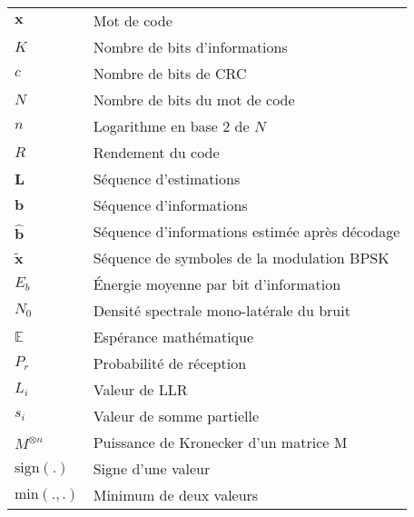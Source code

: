 {
\begin{center}

\begin{longtable}{ p{}  p{} } 

$\mathbold{x}$          & Mot de code                                             \\
$K$                     & Nombre de bits d'informations                           \\
$c$                     & Nombre de bits de CRC                                   \\
$N$                     & Nombre de bits du mot de code                           \\
$n$                     & Logarithme en base 2 de $N$                             \\
$R$                     & Rendement du code                                       \\
$\mathbold{L}$          & Séquence d'estimations                                  \\
$\mathbold{b}$          & Séquence d'informations                                 \\
$\mathbold{\hat{b}}$    & Séquence d'informations estimée après décodage          \\
$\mathbold{\tilde{x}}$  & Séquence de symboles de la modulation BPSK              \\
$E_b$                   & \'Energie moyenne par bit d'information                 \\
$N_0$                   & Densité spectrale mono-latérale du bruit                \\
$\mathbb{E}$            & Espérance mathématique                                  \\
$P_r$                   & Probabilité de réception                                \\
$L_i$                   & Valeur de LLR                                           \\
$s_i$                   & Valeur de somme partielle                               \\
$M^{\otimes n}$         & Puissance de Kronecker d'un matrice M                   \\
$\text{sign}(.)$        & Signe d'une valeur                                      \\
$\text{min}(.,.)$       & Minimum de deux valeurs                                 \\

\end{longtable}
\end{center}}

